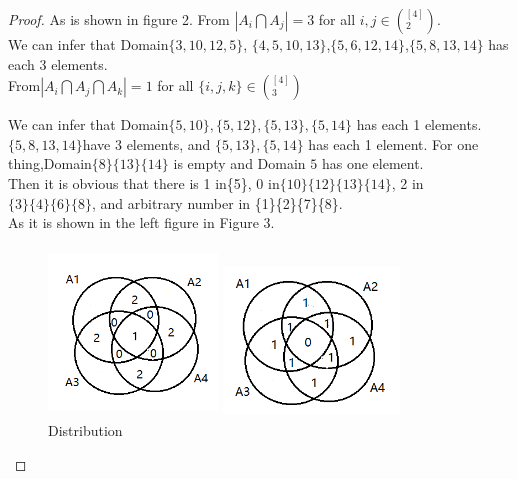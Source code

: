 \documentclass[12pt,a4]{article}
\theoremstyle{exercise}
\begin{document}
\begin{proof}
    As is shown in figure 2.
    From $|A_i\bigcap A_j| = 3$ for all ${i,j} \in (^{[4]}_{2})$.
    \\We can infer that Domain$\{3,10,12,5\}$,
    $\{4,5,10,13\}$,$\{5,6,12,14\}$,$\{5,8,13,14\}$ has each 3 elements.
    \\From$|A_i\bigcap A_j\bigcap A_k| = 1$ for all $\{i,j,k\}\in (^{[4]}_{3})$

    We can infer that Domain$\{5,10\},\{5,12\},\{5,13\},\{5,14\}$ has each 1 elements.
    $\{5,8,13,14\}$have 3 elements, and $\{5,13\} , \{5,14\}$ has each 1 element.
    For one thing,Domain$\{8\}\{13\}\{14\}$ is empty and Domain ${5}$ has one element.
    \\Then it is obvious that there is 1 in\{5\}, 0 in$\{10\}\{12\}\{13\}\{14\}$, 2 in $\{3\}\{4\}\{6\}\{8\}$, and arbitrary number in \{1\}\{2\}\{7\}\{8\}.
    \\As it is shown in the left figure in Figure 3.\\


    \begin{figure}[H]
    \centering
    \begin{minipage}[c]{0.5\textwidth}
    \centering
    \includegraphics[height=4.5cm,width=4.5cm]{Exercise31-2.png}
    \end{minipage}%
    \begin{minipage}[c]{0.5\textwidth}
    \centering
    \includegraphics[height=4.0cm,width=4.7cm]{Exercise31-3.png}
    \end{minipage}
    \caption{Distribution}
    \end{figure}




\end{proof}
\end{document}
